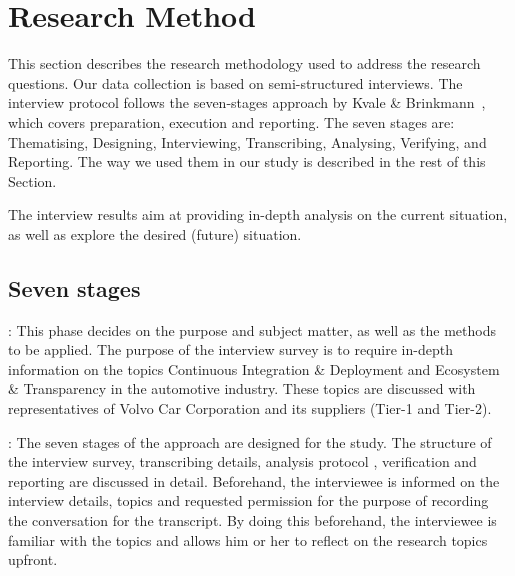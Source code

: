 \section{Research Method}\label{sec:researchMethod}

This section describes the research methodology used to address the research questions.
Our data collection is based on semi-structured interviews. 
The interview protocol follows the seven-stages approach by Kvale \& Brinkmann~\cite{Kvale2015Interviews}, which covers preparation, execution and reporting. The seven stages are: Thematising, Designing, Interviewing, Transcribing, Analysing, Verifying, and Reporting. The way we used them in our study is described in the rest of this Section. 

The interview results aim at providing in-depth analysis on the current situation, as well as explore the desired (future) situation. %

\subsection{Seven stages}

: This phase decides on the purpose and subject matter, as well as the methods to be applied. The purpose of the interview survey is to require in-depth information on the topics Continuous Integration \& Deployment and Ecosystem \& Transparency in the automotive industry. These topics are discussed with representatives of Volvo Car Corporation and its suppliers (Tier-1 and Tier-2). %

: The seven stages of the approach are designed for the study. The structure of the interview survey, transcribing details, analysis protocol \cite{saldana2015coding}, verification and reporting are discussed in detail. Beforehand, the interviewee is informed on the interview details, topics and requested permission for the purpose of recording the conversation for the transcript. By doing this beforehand, the interviewee is familiar with the topics and allows him or her to reflect on the research topics upfront.

